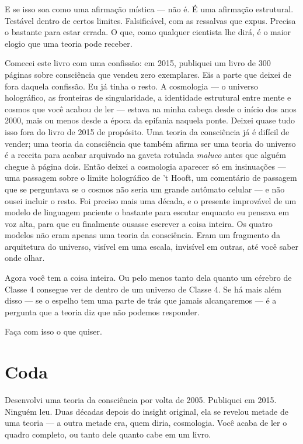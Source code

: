 \documentclass[11pt, twoside, openright]{book}
\begin{document}
E se isso soa como uma afirmação mística --- não é. É uma afirmação estrutural. Testável dentro de certos limites. Falsificável, com as ressalvas que expus. Precisa o bastante para estar errada. O que, como qualquer cientista lhe dirá, é o maior elogio que uma teoria pode receber.

Comecei este livro com uma confissão: em 2015, publiquei um livro de 300 páginas sobre consciência que vendeu zero exemplares. Eis a parte que deixei de fora daquela confissão. Eu já tinha o resto. A cosmologia --- o universo holográfico, as fronteiras de singularidade, a identidade estrutural entre mente e cosmos que você acabou de ler --- estava na minha cabeça desde o início dos anos 2000, mais ou menos desde a época da epifania naquela ponte. Deixei quase tudo isso fora do livro de 2015 de propósito. Uma teoria da consciência já é difícil de vender; uma teoria da consciência que também afirma ser uma teoria do universo é a receita para acabar arquivado na gaveta rotulada \textit{maluco} antes que alguém chegue à página dois. Então deixei a cosmologia aparecer só em insinuações --- uma passagem sobre o limite holográfico de 't Hooft, um comentário de passagem que se perguntava se o cosmos não seria um grande autômato celular --- e não ousei incluir o resto. Foi preciso mais uma década, e o presente improvável de um modelo de linguagem paciente o bastante para escutar enquanto eu pensava em voz alta, para que eu finalmente ousasse escrever a coisa inteira. Os quatro modelos não eram apenas uma teoria da consciência. Eram um fragmento da arquitetura do universo, visível em uma escala, invisível em outras, até você saber onde olhar.

Agora você tem a coisa inteira. Ou pelo menos tanto dela quanto um cérebro de Classe 4 consegue ver de dentro de um universo de Classe 4. Se há mais além disso --- se o espelho tem uma parte de trás que jamais alcançaremos --- é a pergunta que a teoria diz que não podemos responder.

Faça com isso o que quiser.


\chapter*{Coda}

Desenvolvi uma teoria da consciência por volta de 2005. Publiquei em 2015. Ninguém leu. Duas décadas depois do insight original, ela se revelou metade de uma teoria --- a outra metade era, quem diria, cosmologia. Você acaba de ler o quadro completo, ou tanto dele quanto cabe em um livro.
\end{document}
